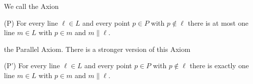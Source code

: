 \begin{Bem}

    We call the Axion 
    \begin{Axiom}(P)
        For every line \(\ell\in L\) and every point \(p\in P\) with \(p\not\in \ell\) there is at most 
one line \(m\in L\) with \(p\in m\) and \(m\parallel \ell\).
    \end{Axiom} the Parallel Axiom. 
    There is a stronger version of this Axiom
    \begin{Axiom}(P')
        For every line \(\ell\in L\) and every point \(p\in P\) with \(p\not\in \ell\) there is exactly 
one line \(m\in L\) with \(p\in m\) and \(m\parallel \ell\).
    \end{Axiom}
\end{Bem}
